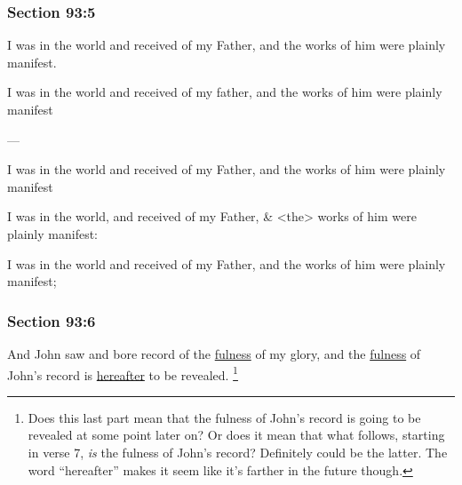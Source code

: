	\subsubsection{Section 93:5} %
		\label{DC93-5}

		I was in the world and received of my Father, and the works of him were plainly manifest.

		\begin{framed}
		\scriptsize
			\begin{compactdesc}
				\item[JSP] I was in the world and received of my father, and the works of him were plainly manifest
				\item[BC] ---
				\item[RB2] I was in the world and received of my Father, and the works of him were plainly manifest
				\item[RB1] I was in the world, and received of my Father, \& <the> works of him were plainly manifest: 
				\item[DC 1835] I was in the world and received of my Father, and the works of him were plainly manifest; 
			\end{compactdesc}
		\end{framed}

	\subsubsection{Section 93:6} %
		\label{DC93-6}

		And John saw and bore record of the \hyperref[FULNESS]{fulness} of my glory, and the \hyperref[FULNESS]{fulness} of John's record is \hyperref[HEREAFTER]{hereafter} to be revealed.%
			\footnote{%
				Does this last part mean that the fulness of John's record is going to be revealed at some point later on? Or does it mean that what follows, starting in verse 7, \textit{is} the fulness of John's record? Definitely could be the latter. The word ``hereafter'' makes it seem like it's farther in the future though.
				}

